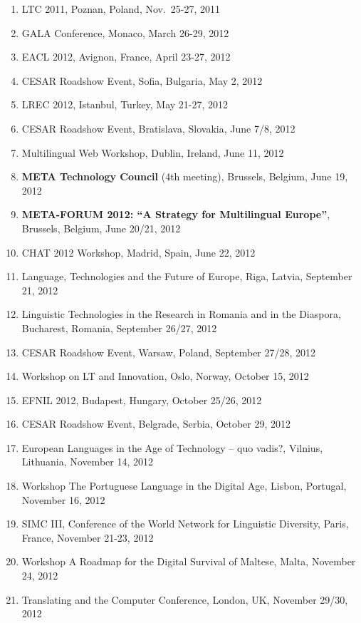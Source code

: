 \documentclass[10pt, plain]{../../metanetpaper}
\begin{document}
\begin{small}
\begin{enumerate}
\item LTC 2011, Poznan, Poland, Nov.~25-27, 2011
\item GALA Conference, Monaco, March 26-29, 2012
\item EACL 2012, Avignon, France, April 23-27, 2012
\item CESAR Roadshow Event, Sofia, Bulgaria, May 2, 2012
\item LREC 2012, Istanbul, Turkey, May 21-27, 2012
\item CESAR Roadshow Event, Bratislava, Slovakia, June 7/8, 2012
\item Multilingual Web Workshop, Dublin, Ireland, June 11, 2012
\item \textbf{META Technology Council} (4th meeting), Brussels, Belgium, June 19, 2012
\item \textbf{META-FORUM 2012: ``A Strategy for Multilingual Europe''}, Brussels, Belgium, June 20/21, 2012
\item CHAT 2012 Workshop, Madrid, Spain, June 22, 2012
\item Language, Technologies and the Future of Europe, Riga, Latvia, September 21, 2012
\item Linguistic Technologies in the Research in Romania and in the Diaspora, Bucharest, Romania, September 26/27, 2012
\item CESAR Roadshow Event, Warsaw, Poland, September 27/28, 2012
\item Workshop on LT and Innovation, Oslo, Norway, October 15, 2012
\item EFNIL 2012, Budapest, Hungary, October 25/26, 2012
\item CESAR Roadshow Event, Belgrade, Serbia, October 29, 2012
\item European Languages in the Age of Technology -- quo vadis?, Vilnius, Lithuania, November 14, 2012
\item Workshop The Portuguese Language in the Digital Age, Lisbon, Portugal, November 16, 2012
\item SIMC III, Conference of the World Network for Linguistic Diversity, Paris, France, November 21-23, 2012
\item Workshop A Roadmap for the Digital Survival of Maltese, Malta, November 24, 2012
\item Translating and the Computer Conference, London, UK, November 29/30, 2012
\end{enumerate}
\end{small}

\clearpage
\end{document}
